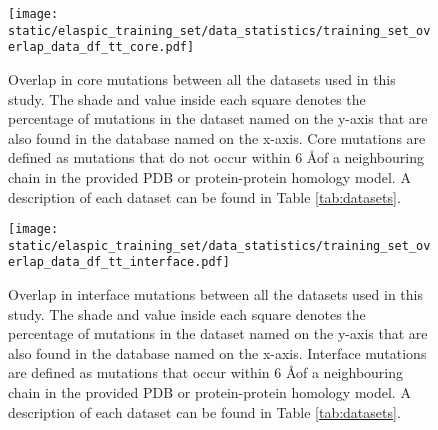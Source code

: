 \clearpage

\begin{figure}[tb]
	\centering
	\texttt{[image: static/elaspic\_training\_set/data\_statistics/training\_set\_overlap\_data\_df\_tt\_core.pdf]}
	\caption[Overlap in core mutation datasets.]{
		Overlap in core mutations between all the datasets used in this study.
		The shade and value inside each square denotes the percentage of mutations in the dataset named on the y-axis that are also found in the database named on the x-axis.
		Core mutations are defined as mutations that do not occur within 6 \AA of a neighbouring chain in the provided PDB or protein-protein homology model.
		A description of each dataset can be found in Table \ref{tab:datasets}.
	}
	\label{fig:training_set_overlap_core}
\end{figure}

\clearpage

\begin{figure}[tb]
	\centering
	\texttt{[image: static/elaspic\_training\_set/data\_statistics/training\_set\_overlap\_data\_df\_tt\_interface.pdf]}
	\caption[Overlap in interface mutation datasets.]{
		Overlap in interface mutations between all the datasets used in this study.
		The shade and value inside each square denotes the percentage of mutations in the dataset named on the y-axis that are also found in the database named on the x-axis.
		Interface mutations are defined as mutations that occur within 6 \AA of a neighbouring chain in the provided PDB or protein-protein homology model.
		A description of each dataset can be found in Table \ref{tab:datasets}.
	}
	\label{fig:training_set_overlap_interface}
\end{figure}
